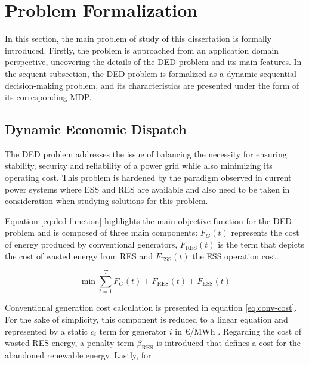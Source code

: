 \section{Problem Formalization}

In this section, the main problem of study of this dissertation is formally introduced. Firstly, the problem is approached from an application domain perspective, uncovering the details of the \ac{DED} problem and its main features. In the sequent subsection, the \ac{DED} problem is formalized as a dynamic sequential decision-making problem, and its characteristics are presented under the form of its corresponding \ac{MDP}.

\subsection{Dynamic Economic Dispatch}

The \ac{DED} problem addresses the issue of balancing the necessity for ensuring stability, security and reliability of a power grid while also minimizing its operating cost. This problem is hardened by the paradigm observed in current power systems where \ac{ESS} and \ac{RES} are available and also need to be taken in consideration when studying solutions for this problem. \par
Equation \ref{eq:ded-function} highlights the main objective function for the \ac{DED} problem and is composed of three main components: $F_G(t)$ represents the cost of energy produced by conventional generators, $F_\text{RES}(t)$ is the term that depicts the cost of wasted energy from \ac{RES} and $F_{\text{ESS}}(t)$ the \ac{ESS} operation cost. \par

\begin{equation} \label{eq:ded-function}
 \min\sum^T_{t=1}F_G(t) + F_{\text{RES}}(t) + F_{\text{ESS}}(t)
\end{equation}

Conventional generation cost calculation is presented in equation \ref{eq:conv-cost}. For the sake of simplicity, this component is reduced to a linear equation and represented by a static $c_i$ term for generator $i$ in €/MWh . Regarding the cost of wasted \ac{RES} energy, a penalty term $\beta_\text{RES}$ is introduced that defines a cost for the abandoned renewable energy. Lastly, for

